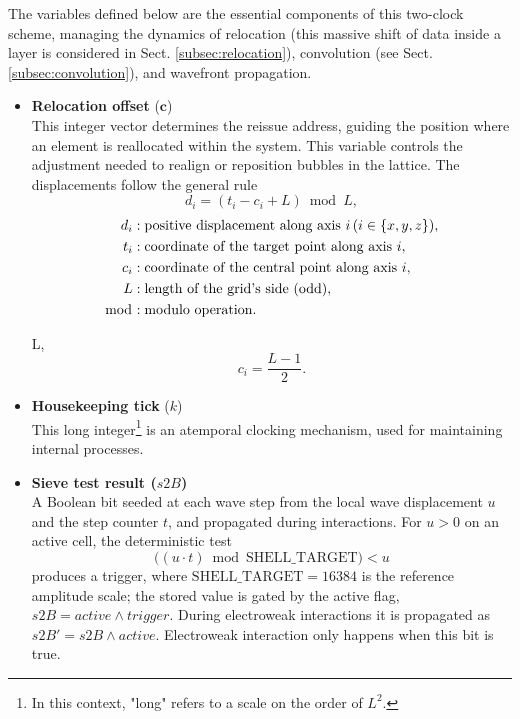 \documentclass{ijuc}
\begin{document}
The variables defined below are the essential components of this two-clock scheme, managing the dynamics of relocation (this massive shift of data inside a layer is considered in Sect. \ref{subsec:relocation}), convolution (see Sect. \ref{subsec:convolution}), and wavefront propagation.
\begin{itemize}
    \item \textbf{Relocation offset} ($\textbf{c}$)\\
 This integer vector determines the reissue address, guiding the position where an element is reallocated within the system. This variable controls the adjustment needed to realign or reposition bubbles in the lattice. The displacements follow the general rule
 \[
d_i = (t_i - c_i + L) \bmod L,
\]
\begin{align*}
d_i & : \text{positive displacement along axis } i \, (i \in \{x, y, z\}), \\
t_i & : \text{coordinate of the target point along axis } i, \\
c_i & : \text{coordinate of the central point along axis } i, \\
L & : \text{length of the grid's side (odd)}, \\
\bmod & : \text{modulo operation}.
\end{align*}

 L, 
\[
c_i = \frac{L - 1}{2}.
\]

    \item \textbf{Housekeeping tick} ($k$)\\
 This long integer\footnote{In this context, "long" refers to a scale on the order of $L^2$.} is an atemporal clocking mechanism, used for maintaining internal processes.
 
   \item \textbf{Sieve test result ($s2B$)} \\
    A Boolean bit seeded at each wave step from the local wave displacement $u$ and the step counter $t$, and propagated during interactions. For $u>0$ on an active cell, the deterministic test
    \[
    \bigl((u \cdot t) \bmod \mathrm{SHELL\_TARGET}\bigr) < u
    \]
    produces a trigger, where $\mathrm{SHELL\_TARGET}=16384$ is the reference amplitude scale; the stored value is gated by the active flag, $s2B = \mathit{active} \land \mathit{trigger}$. During electroweak interactions it is propagated as $s2B' = s2B \land \mathit{active}$. Electroweak interaction only happens when this bit is true.
    

\end{itemize}
\end{document}
